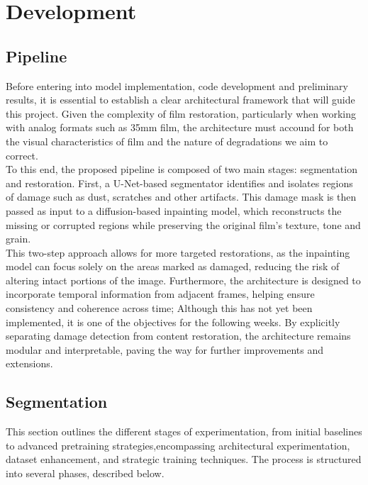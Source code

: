 \documentclass[openany, 12pt]{article}
\begin{document}
{\color{blue}
	\section{Development}
	\subsection{Pipeline}
	Before entering into model implementation, code development and preliminary results, it is essential to establish a clear architectural framework that will guide this project. Given the complexity of film restoration, particularly when working with analog formats such as 35mm film, the architecture must accound for both the visual characteristics of film and the nature of degradations we aim to correct.\\
	To this end, the proposed pipeline is composed of two main stages: segmentation and restoration. First, a U-Net-based segmentator identifies and isolates regions of damage such as dust, scratches and other artifacts. This damage mask is then passed as input to a diffusion-based inpainting model, which reconstructs the missing or corrupted regions while preserving the original film's texture, tone and grain.\\
	This two-step approach allows for more targeted restorations, as the inpainting model can focus solely on the areas marked as damaged, reducing the risk of altering intact portions of the image. Furthermore, the architecture is designed to incorporate temporal information from adjacent frames, helping ensure consistency and coherence across time; Although this has not yet been implemented, it is one of the objectives for the following weeks. By explicitly separating damage detection from content restoration, the architecture remains modular and interpretable, paving the way for further improvements and extensions. 
	 
	\subsection{Segmentation}
	This section outlines the different stages of experimentation, from initial baselines to advanced pretraining strategies,encompassing architectural experimentation, dataset enhancement, and strategic training techniques. The process is structured into several phases, described below.
}
\end{document}
